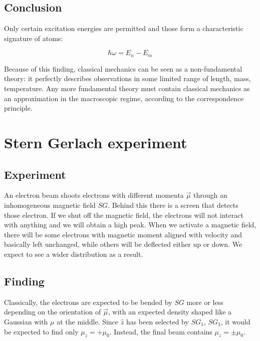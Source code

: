   \subsection{Conclusion}
  Only certain excitation energies are permitted and those form a characteristic signature of atoms:

  $$\hbar\omega = E_n-E_m$$

  Because of this finding, classical mechanics can be seen as a non-fundamental theory: it perfectly describes observations in some limited range of length, mass, temperature.
  Any more fundamental theory must contain classical mechanics as an approximation in the macroscopic regime, according to the correspondence principle.

\section{Stern Gerlach experiment}

  \subsection{Experiment}
  An electron beam shoots electrons with different momenta $\vec{\mu}$ through an inhomogeneous magnetic field $SG$.
  Behind this there is a screen that detects those electron. If we shut off the magnetic field, the electrons will not interact with anything and we will obtain a high peak. When we activate a magnetic field, there will be some electrons with magnetic moment aligned with velocity and basically left unchanged, while others will be deflected either up or down. We expect to see a wider distribution as a result.

  \subsection{Finding}
  Classically, the electrons are expected to be bended by $SG$ more or less depending on the orientation of $\vec{\mu}$, with an expected density shaped like a Gaussian with $\mu$ at the middle.
  Since $\hat{z}$ has been selected by $SG_1$, $SG_3$, it would be expected to find only $\mu_z = + \mu_0$. Instead, the final beam contains $\mu_z =\pm \mu_0$.

